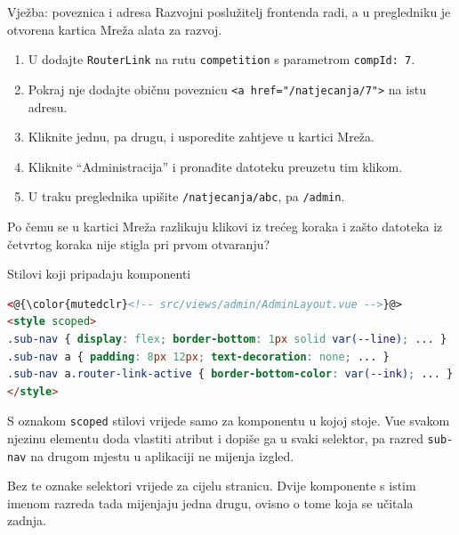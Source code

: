 \begin{frame}{Vježba: poveznica i adresa}
Razvojni poslužitelj frontenda radi, a u pregledniku je otvorena kartica Mreža alata za razvoj.

\vspace{0.7em}
\begin{enumerate}
  \itemsep0.35em
  \item U  dodajte \texttt{RouterLink} na rutu \texttt{competition} s parametrom \texttt{compId: 7}.
  \item Pokraj nje dodajte običnu poveznicu \texttt{<a href="/natjecanja/7">} na istu adresu.
  \item Kliknite jednu, pa drugu, i usporedite zahtjeve u kartici Mreža.
  \item Kliknite \enquote{Administracija} i pronađite datoteku preuzetu tim klikom.
  \item U traku preglednika upišite \texttt{/natjecanja/abc}, pa \texttt{/admin}.
\end{enumerate}

\vspace{0.7em}
Po čemu se u kartici Mreža razlikuju klikovi iz trećeg koraka i zašto datoteka iz četvrtog koraka nije stigla pri prvom otvaranju?
\end{frame}


\begin{frame}[fragile]{Stilovi koji pripadaju komponenti}
\begin{lstlisting}[language=html]
<@{\color{mutedclr}<!-- src/views/admin/AdminLayout.vue -->}@>
<style scoped>
.sub-nav { display: flex; border-bottom: 1px solid var(--line); ... }
.sub-nav a { padding: 8px 12px; text-decoration: none; ... }
.sub-nav a.router-link-active { border-bottom-color: var(--ink); ... }
</style>
\end{lstlisting}

\vspace{0.3em}
S oznakom \texttt{scoped} stilovi vrijede samo za komponentu u kojoj stoje. Vue svakom njezinu elementu doda vlastiti atribut i dopiše ga u svaki selektor, pa razred \texttt{sub-nav} na drugom mjestu u aplikaciji ne mijenja izgled.

\vspace{0.3em}
Bez te oznake selektori vrijede za cijelu stranicu. Dvije komponente s istim imenom razreda tada mijenjaju jedna drugu, ovisno o tome koja se učitala zadnja.
\end{frame}


